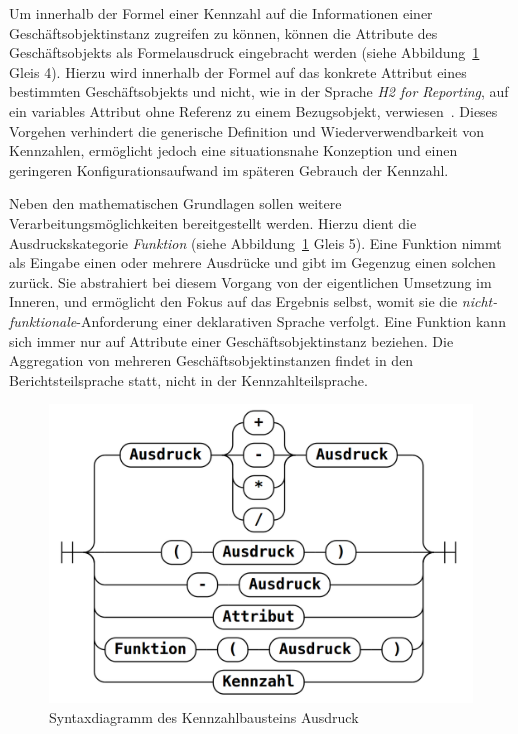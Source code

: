 \documentclass[
  language=german, %
  type=bachelor,%
  ngerman
]{isthesis}
\begin{document}
\begin{content}
	
  Um innerhalb der Formel einer Kennzahl auf die Informationen einer
  Geschäftsobjektinstanz zugreifen zu können, können die Attribute des
  Geschäftsobjekts als Formelausdruck eingebracht werden (siehe
  Abbildung~\ref{railroad-kennzahl} Gleis 4). Hierzu wird innerhalb der Formel
  auf das konkrete Attribut eines bestimmten Geschäftsobjekts und nicht, wie
  in der Sprache \textit{H2 for Reporting}, auf ein variables Attribut ohne
  Referenz zu einem Bezugsobjekt, verwiesen~\cite[][S.  20]{becker2007h2}.
  Dieses Vorgehen verhindert die generische Definition und Wiederverwendbarkeit
  von Kennzahlen, ermöglicht jedoch eine situationsnahe Konzeption und einen
  geringeren Konfigurationsaufwand im späteren Gebrauch der Kennzahl.

	Neben den mathematischen Grundlagen sollen weitere Verarbeitungsmöglichkeiten
	bereitgestellt werden. Hierzu dient die Ausdruckskategorie \textit{Funktion}
	(siehe Abbildung~\ref{railroad-kennzahl} Gleis 5). Eine Funktion nimmt als
	Eingabe einen oder mehrere Ausdrücke und gibt im Gegenzug einen solchen
	zurück. Sie abstrahiert bei diesem Vorgang von der eigentlichen Umsetzung im
	Inneren, und ermöglicht den Fokus auf das Ergebnis selbst, womit sie die
	\textit{nicht-funktionale}-Anforderung einer deklarativen Sprache verfolgt.
	Eine Funktion kann sich immer nur auf Attribute einer Geschäftsobjektinstanz
	beziehen. Die Aggregation von mehreren Geschäftsobjektinstanzen findet in den
	Berichtsteilsprache statt, nicht in der Kennzahlteilsprache.


  \begin{figure}
    \includegraphics[scale=0.25]{content/figures/railroad-kennzahl.png}
    \caption[Syntaxdiagramm des Kennzahlbausteins Ausdruck]{Syntaxdiagramm des Kennzahlbausteins Ausdruck\protect\footnotemark}\label{railroad-kennzahl}
  \end{figure}


\end{content}
\end{document}
